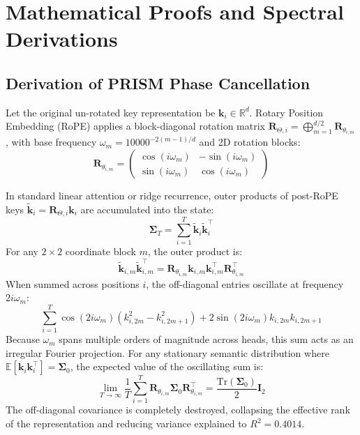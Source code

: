 \documentclass[11pt,a4paper]{article}
\begin{document}
\section{Mathematical Proofs and Spectral Derivations}
\label{app:proofs}

\subsection{Derivation of PRISM Phase Cancellation}
Let the original un-rotated key representation be $\mathbf{k}_i \in \mathbb{R}^d$. Rotary Position Embedding (RoPE) applies a block-diagonal rotation matrix $\mathbf{R}_{\Theta, i} = \bigoplus_{m=1}^{d/2} \mathbf{R}_{\theta_{i,m}}$, with base frequency $\omega_m = 10000^{-2(m-1)/d}$ and 2D rotation blocks:
\begin{equation}
\mathbf{R}_{\theta_{i,m}} = \begin{pmatrix} \cos(i \omega_m) & -\sin(i \omega_m) \\ \sin(i \omega_m) & \cos(i \omega_m) \end{pmatrix}
\end{equation}

In standard linear attention or ridge recurrence, outer products of post-RoPE keys $\tilde{\mathbf{k}}_i = \mathbf{R}_{\Theta, i}\mathbf{k}_i$ are accumulated into the state:
\begin{equation}
\mathbf{\Sigma}_T = \sum_{i=1}^T \tilde{\mathbf{k}}_i \tilde{\mathbf{k}}_i^\top
\end{equation}
For any $2 \times 2$ coordinate block $m$, the outer product is:
\begin{equation}
\tilde{\mathbf{k}}_{i,m} \tilde{\mathbf{k}}_{i,m}^\top = \mathbf{R}_{\theta_{i,m}} \mathbf{k}_{i,m} \mathbf{k}_{i,m}^\top \mathbf{R}_{\theta_{i,m}}^\top
\end{equation}
When summed across positions $i$, the off-diagonal entries oscillate at frequency $2 i \omega_m$:
\begin{equation}
\sum_{i=1}^T \cos(2 i \omega_m) \left(k_{i,2m}^2 - k_{i,2m+1}^2\right) + 2 \sin(2 i \omega_m) k_{i,2m} k_{i,2m+1}
\end{equation}
Because $\omega_m$ spans multiple orders of magnitude across heads, this sum acts as an irregular Fourier projection. For any stationary semantic distribution where $\mathbb{E}[\mathbf{k}_i \mathbf{k}_i^\top] = \mathbf{\Sigma}_0$, the expected value of the oscillating sum is:
\begin{equation}
\lim_{T \to \infty} \frac{1}{T} \sum_{i=1}^T \mathbf{R}_{\theta_{i,m}} \mathbf{\Sigma}_0 \mathbf{R}_{\theta_{i,m}}^\top = \frac{\text{Tr}(\mathbf{\Sigma}_0)}{2} \mathbf{I}_2
\end{equation}
The off-diagonal covariance is completely destroyed, collapsing the effective rank of the representation and reducing variance explained to $R^2 = 0.4014$.
\end{document}
